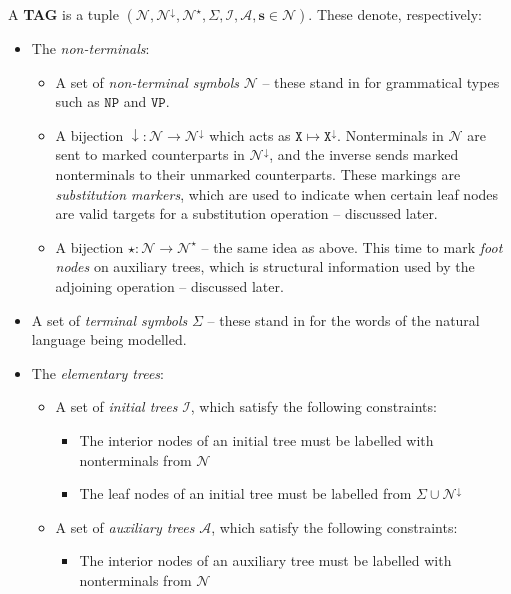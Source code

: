 \begin{defn}
A \textbf{TAG} is a tuple $(\mathcal{N}, \mathcal{N}^\downarrow, \mathcal{N}^\star, \Sigma, \mathcal{I}, \mathcal{A}, \mathbf{s} \in \mathcal{N})$. These denote, respectively:
\begin{itemize}
	\item{ The \emph{non-terminals}:
		\begin{itemize}
			\item{A set of \emph{non-terminal symbols} $\mathcal{N}$ -- these stand in for grammatical types such as $\texttt{NP}$ and $\texttt{VP}$.}
			\item{A bijection $\downarrow: \mathcal{N} \rightarrow \mathcal{N}^\downarrow$ which acts as $\texttt{X} \mapsto \texttt{X}^\downarrow$. Nonterminals in $\mathcal{N}$ are sent to marked counterparts in $\mathcal{N}^\downarrow$, and the inverse sends marked nonterminals to their unmarked counterparts. These markings are \emph{substitution markers}, which are used to indicate when certain leaf nodes are valid targets for a substitution operation -- discussed later.}
			\item{A bijection $\star: \mathcal{N} \rightarrow \mathcal{N}^\star$ -- the same idea as above. This time to mark \emph{foot nodes} on auxiliary trees, which is structural information used by the adjoining operation -- discussed later.}
	\end{itemize}
	}
	\item{A set of \emph{terminal symbols} $\Sigma$ -- these stand in for the words of the natural language being modelled.}
	\item{The \emph{elementary trees}:
		\begin{itemize}
			\item{A set of \emph{initial trees} $\mathcal{I}$, which satisfy the following constraints:
			\begin{itemize}
				\item{The interior nodes of an initial tree must be labelled with nonterminals from $\mathcal{N}$}
				\item{The leaf nodes of an initial tree must be labelled from $\Sigma \cup \mathcal{N}^{\downarrow}$}
			\end{itemize}
			}
	\item{A set of \emph{auxiliary trees} $\mathcal{A}$, which satisfy the following constraints:
		\begin{itemize}
			\item{The interior nodes of an auxiliary tree must be labelled with nonterminals from $\mathcal{N}$}

\end{itemize}}
\end{itemize}}
\end{itemize}
\end{defn}
